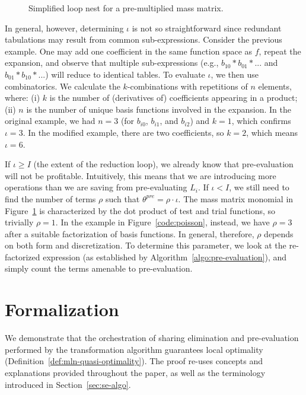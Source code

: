 \begin{figure}[h]\begin{CenteredBox}

\end{CenteredBox}\caption{Simplified loop nest for a pre-multiplied mass matrix.}\label{code:increase_factor}\end{figure}

In general, however, determining $\iota$ is not so straightforward since redundant tabulations may result from common sub-expressions. Consider the previous example. One may add one coefficient in the same function space as $f$, repeat the expansion, and observe that multiple sub-expressions (e.g., $b_{10}*b_{01}*...$ and $b_{01}*b_{10}*...$) will reduce to identical tables. To evaluate $\iota$, we then use combinatorics. We calculate the $k$-combinations with repetitions of $n$ elements, where: (i) $k$ is the number of (derivatives of) coefficients appearing in a product; (ii) $n$ is the number of unique basis functions involved in the expansion. In the original example, we had $n=3$ (for $b_{i0}$, $b_{i1}$, and $b_{i2}$) and $k=1$, which confirms $\iota=3$. In the modified example, there are two coefficients, so $k=2$, which means $\iota=6$.

If $\iota \geq I$ (the extent of the reduction loop), we already know that pre-evaluation will not be profitable. Intuitively, this means that we are introducing more operations than we are saving from pre-evaluating $L_i$. If $\iota < I$, we still need to find the number of terms $\rho$ such that $\theta^{pre} = \rho \cdot \iota$. The mass matrix monomial in Figure~\ref{code:increase_factor} is characterized by the dot product of test and trial functions, so trivially $\rho = 1$. In the example in Figure~\ref{code:poisson}, instead, we have $\rho = 3$ after a suitable factorization of basis functions. In general, therefore, $\rho$ depends on both form and discretization. To determine this parameter, we look at the re-factorized expression (as established by Algorithm~\ref{algo:pre-evaluation}), and simply count the terms amenable to pre-evaluation.

\section{Formalization}
\label{sec:proof}
We demonstrate that the orchestration of sharing elimination and pre-evaluation performed by the transformation algorithm guarantees local optimality (Definition~\ref{def:mln-quasi-optimality}). The proof re-uses concepts and explanations provided throughout the paper, as well as the terminology introduced in Section~\ref{sec:se-algo}.

